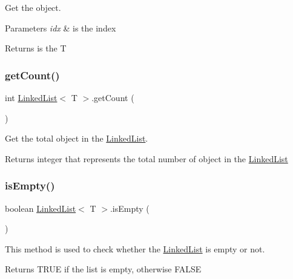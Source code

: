 Get the object.


\begin{DoxyParams}{Parameters}
{\em idx} & is the index \\
\hline
\end{DoxyParams}
\begin{DoxyReturn}{Returns}
is the T 
\end{DoxyReturn}
\mbox{\label{class_linked_list_acd5221f9ec3d5eafa37321d5ef0b9396}} 
\subsubsection{\texorpdfstring{get\+Count()}{getCount()}}
{\footnotesize\ttfamily int \mbox{\hyperlink{class_linked_list}{Linked\+List}}$<$ T $>$.get\+Count (\begin{DoxyParamCaption}{ }\end{DoxyParamCaption})\hspace{0.3cm}{\ttfamily [inline]}}

Get the total object in the \mbox{\hyperlink{class_linked_list}{Linked\+List}}.

\begin{DoxyReturn}{Returns}
integer that represents the total number of object in the \mbox{\hyperlink{class_linked_list}{Linked\+List}} 
\end{DoxyReturn}
\mbox{\label{class_linked_list_aecae3d82587c52087a4f65d6c56900e2}} 
\subsubsection{\texorpdfstring{is\+Empty()}{isEmpty()}}
{\footnotesize\ttfamily boolean \mbox{\hyperlink{class_linked_list}{Linked\+List}}$<$ T $>$.is\+Empty (\begin{DoxyParamCaption}{ }\end{DoxyParamCaption})\hspace{0.3cm}{\ttfamily [inline]}}

This method is used to check whether the \mbox{\hyperlink{class_linked_list}{Linked\+List}} is empty or not.

\begin{DoxyReturn}{Returns}
T\+R\+UE if the list is empty, otherwise F\+A\+L\+SE 
\end{DoxyReturn}
\mbox{\label{class_linked_list_ad4873babcc03951eafb5cc17daebbfaf}} 
